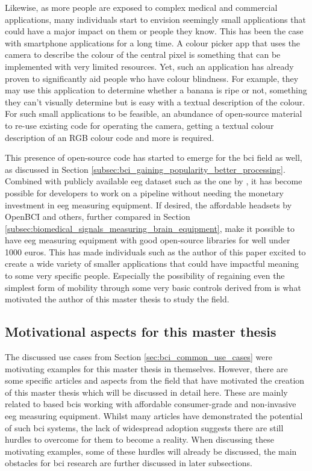Likewise, as more people are exposed to complex medical and commercial applications, many individuals start to envision seemingly small applications that could have a major impact on them or people they know.
This has been the case with smartphone applications for a long time.
A colour picker app that uses the camera to describe the colour of the central pixel is something that can be implemented with very limited resources.
Yet, such an application has already proven to significantly aid people who have colour blindness.
For example, they may use this application to determine whether a banana is ripe or not, something they can't visually determine but is easy with a textual description of the colour.
For such small applications to be feasible, an abundance of open-source material to re-use existing code for operating the camera, getting a textual colour description of an RGB colour code and more is required.

This presence of open-source code has started to emerge for the \gls{bci} field as well, as discussed in Section \ref{subsec:bci_gaining_popularity_better_processing}.
Combined with publicly available \gls{eeg} dataset such as the one by \citet{eeg_data}, it has become possible for developers to work on a pipeline without needing the monetary investment in \gls{eeg} measuring equipment.
If desired, the affordable headsets by OpenBCI and others, further compared in Section \ref{subsec:biomedical_signals_measuring_brain_equipment}, make it possible to have \gls{eeg} measuring equipment with good open-source libraries for well under 1000 euros.
This has made individuals such as the author of this paper excited to create a wide variety of smaller applications that could have impactful meaning to some very specific people.
Especially the possibility of regaining even the simplest form of mobility through some very basic controls derived from  is what motivated the author of this master thesis to study the field.



\subsection{Motivational aspects for this master thesis}
\label{subsec:bci_opportunities_obstacles_motivating_examples} 

The discussed use cases from Section \ref{sec:bci_common_use_cases} were motivating examples for this master thesis in themselves.
However, there are some specific articles and aspects from the field that have motivated the creation of this master thesis which will be discussed in detail here.
These are mainly related to  based \glspl{bci} working with affordable consumer-grade and non-invasive \gls{eeg} measuring equipment.
Whilst many articles have demonstrated the potential of such \gls{bci} systems, the lack of widespread adoption suggests there are still hurdles to overcome for them to become a reality.
When discussing these motivating examples, some of these hurdles will already be discussed, the main obstacles for \gls{bci} research are further discussed in later subsections.



